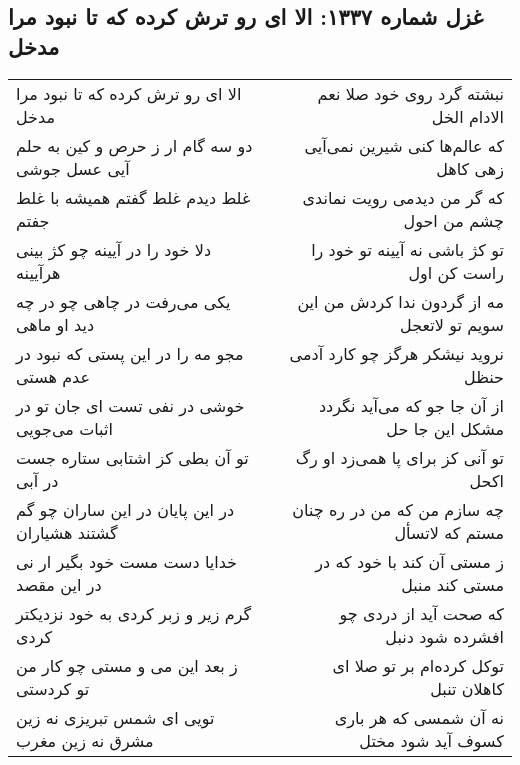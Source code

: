 \begin{center}
\section*{غزل شماره ۱۳۳۷: الا ای رو ترش کرده که تا نبود مرا مدخل}
\label{sec:1337}
\begin{longtable}{l p{0.5cm} r}
الا ای رو ترش کرده که تا نبود مرا مدخل
&&
نبشته گرد روی خود صلا نعم الادام الخل
\\
دو سه گام ار ز حرص و کین به حلم آیی عسل جوشی
&&
که عالم‌ها کنی شیرین نمی‌آیی زهی کاهل
\\
غلط دیدم غلط گفتم همیشه با غلط جفتم
&&
که گر من دیدمی رویت نماندی چشم من احول
\\
دلا خود را در آیینه چو کژ بینی هرآیینه
&&
تو کژ باشی نه آیینه تو خود را راست کن اول
\\
یکی می‌رفت در چاهی چو در چه دید او ماهی
&&
مه از گردون ندا کردش من این سویم تو لاتعجل
\\
مجو مه را در این پستی که نبود در عدم هستی
&&
نروید نیشکر هرگز چو کارد آدمی حنظل
\\
خوشی در نفی تست ای جان تو در اثبات می‌جویی
&&
از آن جا جو که می‌آید نگردد مشکل این جا حل
\\
تو آن بطی کز اشتابی ستاره جست در آبی
&&
تو آنی کز برای پا همی‌زد او رگ اکحل
\\
در این پایان در این ساران چو گم گشتند هشیاران
&&
چه سازم من که من در ره چنان مستم که لاتسأل
\\
خدایا دست مست خود بگیر ار نی در این مقصد
&&
ز مستی آن کند با خود که در مستی کند منبل
\\
گرم زیر و زبر کردی به خود نزدیکتر کردی
&&
که صحت آید از دردی چو افشرده شود دنبل
\\
ز بعد این می و مستی چو کار من تو کردستی
&&
توکل کرده‌ام بر تو صلا ای کاهلان تنبل
\\
تویی ای شمس تبریزی نه زین مشرق نه زین مغرب
&&
نه آن شمسی که هر باری کسوف آید شود مختل
\\
\end{longtable}
\end{center}

